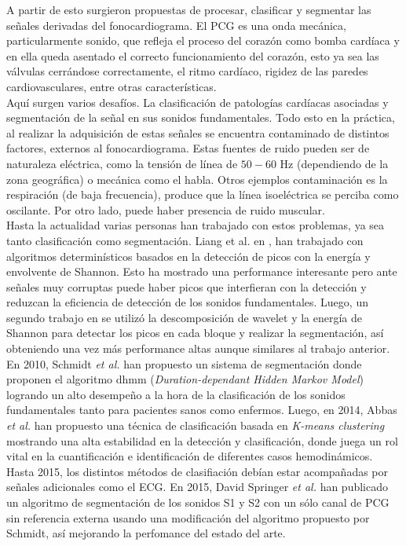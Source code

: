     A partir de esto surgieron propuestas de procesar, clasificar y segmentar las señales derivadas del fonocardiograma. El PCG es una onda mecánica, particularmente sonido, que refleja el proceso del corazón como bomba cardíaca y en ella queda asentado el correcto funcionamiento del corazón, esto ya sea las válvulas cerrándose correctamente, el ritmo cardíaco, rigidez de las paredes cardiovasculares, entre otras características. \\
    \indent Aquí surgen varios desafíos. La clasificación de patologías cardíacas asociadas y segmentación de la señal en sus sonidos fundamentales. Todo esto en la práctica, al realizar la adquisición de estas señales se encuentra contaminado de distintos factores, externos al fonocardiograma. Estas fuentes de ruido pueden ser de naturaleza eléctrica, como la tensión de línea de $50-60$ Hz (dependiendo de la zona geográfica) o mecánica como el habla. Otros ejemplos contaminación es la respiración (de baja frecuencia), produce que la línea isoeléctrica se perciba como oscilante. Por otro lado, puede haber presencia de ruido muscular. \\
    \indent Hasta la actualidad varias personas han trabajado con estos problemas, ya sea tanto clasificación como segmentación. Liang et al. en \cite{pp:liang}, han trabajado con algoritmos determinísticos basados en la detección de picos con la energía y envolvente de Shannon. Esto ha mostrado una performance interesante pero ante señales muy corruptas puede haber picos que interfieran con la detección y reduzcan la eficiencia de detección de los sonidos fundamentales. Luego, un segundo trabajo en \cite{pp:liang2} se utilizó la descomposición de wavelet y la energía de Shannon para detectar los picos en cada bloque y realizar la segmentación, así obteniendo una vez más performance altas aunque similares al trabajo anterior. \\
    \indent En 2010, Schmidt \textit{et al.} \cite{pp:schmidt2010} han propuesto un sistema de segmentación donde proponen el algoritmo \acrshort{dhmm} (\textit{Duration-dependant Hidden Markov Model}) logrando un alto desempeño a la hora de la clasificación de los sonidos fundamentales tanto para pacientes sanos como enfermos. Luego, en 2014, Abbas \textit{et al.} \cite{pp:abbas2014} han propuesto una técnica de clasificación basada en \textit{K-means clustering} mostrando una alta estabilidad en la detección y clasificación, donde juega un rol vital en la cuantificación e identificación de diferentes casos hemodinámicos. Hasta 2015, los distintos métodos de clasifiación debían estar acompañadas por señales adicionales como el ECG. En 2015, David Springer \textit{et al.} \cite{pp:springer2015} han publicado un algoritmo de segmentación de los sonidos S1 y S2 con un sólo canal de PCG sin referencia externa usando una modificación del algoritmo propuesto por Schmidt, así mejorando la perfomance del estado del arte. \\
